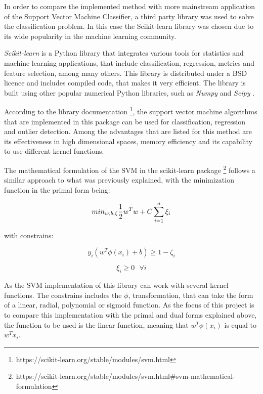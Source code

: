 \documentclass[11pt,twocolumn,letterpaper]{article}
\begin{document}
In order to compare the implemented method with more mainstream application of the Support Vector Machine Classifier, a third party library was used to solve the classification problem. In this case the Scikit-learn library was chosen due to its wide popularity in the machine learning community.

\textit{Scikit-learn} is a Python library that integrates various tools for statistics and machine learning applications, that include classification, regression, metrics and feature selection, among many others. This library is distributed under a BSD licence and includes compiled code, that makes it very efficient. The library is built using other popular numerical Python libraries, such as \textit{Numpy} and \textit{Scipy} \cite{Pedregosa2011}.

According to the library documentation \footnote{https://scikit-learn.org/stable/modules/svm.html}, the support vector machine algorithms that are implemented in this package can be used for classification, regression and outlier detection. Among the advantages that are listed for this method are its effectiveness in high dimensional spaces, memory efficiency and its capability to use different kernel functions.

The mathematical formulation of the SVM in the scikit-learn package
\footnote{https://scikit-learn.org/stable/modules/svm.html\#svm-mathematical-formulation}
 follows a similar approach to what was previously explained, with the minimization function in the primal form being:

 
 \begin{equation}
 min_ {w, b, \zeta} \frac{1}{2} w^T w + C \sum_{i=1}^{n} \xi_i\\
  \end{equation}
 

 with constrains:
 
 \begin{equation}
 	y_i (w^T \phi (x_i) + b) \geq 1 - \zeta_i
 \end{equation}
 
 \begin{equation}
 	\xi_i  \geq 0 \:\:\: \forall i
 \end{equation}
 
As the SVM implementation of this library can work with several kernel functions. The constrains includes the $\phi$, transformation, that can take the form of a linear, radial, polynomial or sigmoid function. As the focus of this project is to compare this implementation with the primal and dual forms explained above, the function to be used is the linear function, meaning that $w^T \phi (x_i)$ is equal to $w^T x_i$.
\end{document}
